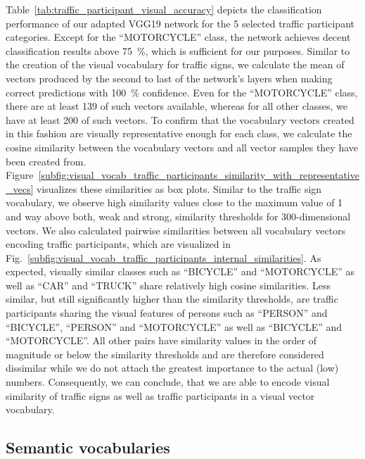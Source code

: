 Table~\ref{tab:traffic_participant_visual_accuracy} depicts the classification performance of our adapted VGG19 network for the \num{5} selected traffic participant categories.
Except for the \enquote{MOTORCYCLE} class, the network achieves decent classification results above \SI{75}{\percent}, which is sufficient for our purposes.
Similar to the creation of the visual vocabulary for traffic signs, we calculate the mean of vectors produced by the second to last of the network's layers when making correct predictions with \SI{100}{\percent} confidence.
Even for the \enquote{MOTORCYCLE} class, there are at least \num{139} of such vectors available, whereas for all other classes, we have at least \num{200} of such vectors.
To confirm that the vocabulary vectors created in this fashion are visually representative enough for each class, we calculate the cosine similarity between the vocabulary vectors and all vector samples they have been created from.
Figure~\ref{subfig:visual_vocab_traffic_participants_similarity_with_representative_vecs} visualizes these similarities as box plots.
Similar to the traffic sign vocabulary, we observe high similarity values close to the maximum value of \num{1} and way above both, weak and strong, similarity thresholds for \num{300}-dimensional vectors.
We also calculated pairwise similarities between all vocabulary vectors encoding traffic participants, which are visualized in Fig.~\ref{subfig:visual_vocab_traffic_participants_internal_similarities}.
As expected, visually similar classes such as \enquote{BICYCLE} and \enquote{MOTORCYCLE} as well as \enquote{CAR} and \enquote{TRUCK} share relatively high cosine similarities.
Less similar, but still significantly higher than the similarity thresholds, are traffic participants sharing the visual features of persons such as \enquote{PERSON} and \enquote{BICYCLE}, \enquote{PERSON} and \enquote{MOTORCYCLE} as well as \enquote{BICYCLE} and \enquote{MOTORCYCLE}.
All other pairs have similarity values in the order of magnitude or below the similarity thresholds and are therefore considered dissimilar while we do not attach the greatest importance to the actual (low) numbers.
Consequently, we can conclude, that we are able to encode visual similarity of traffic signs as well as traffic participants in a visual vector vocabulary.

\subsection{Semantic vocabularies}%
\label{subsec:semantic_vocabularies}

